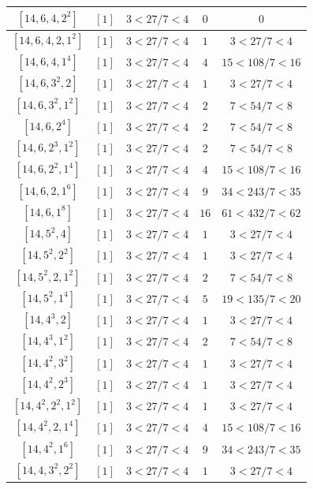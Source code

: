 \documentclass{article}%
\begin{document}
\begin{center}
\begin{longtable}{||c|c|c|c|c||}
$[14, 6, 4, 2^{2}]$ & $[1]$ & $3 < 27/7 < 4$ & $0$ & $0$ \\ \hline 
$[14, 6, 4, 2, 1^{2}]$ & $[1]$ & $3 < 27/7 < 4$ & $1$ & $3 < 27/7 < 4$ \\ \hline 
$[14, 6, 4, 1^{4}]$ & $[1]$ & $3 < 27/7 < 4$ & $4$ & $15 < 108/7 < 16$ \\ \hline 
$[14, 6, 3^{2}, 2]$ & $[1]$ & $3 < 27/7 < 4$ & $1$ & $3 < 27/7 < 4$ \\ \hline 
$[14, 6, 3^{2}, 1^{2}]$ & $[1]$ & $3 < 27/7 < 4$ & $2$ & $7 < 54/7 < 8$ \\ \hline 
$[14, 6, 2^{4}]$ & $[1]$ & $3 < 27/7 < 4$ & $2$ & $7 < 54/7 < 8$ \\ \hline 
$[14, 6, 2^{3}, 1^{2}]$ & $[1]$ & $3 < 27/7 < 4$ & $2$ & $7 < 54/7 < 8$ \\ \hline 
$[14, 6, 2^{2}, 1^{4}]$ & $[1]$ & $3 < 27/7 < 4$ & $4$ & $15 < 108/7 < 16$ \\ \hline 
$[14, 6, 2, 1^{6}]$ & $[1]$ & $3 < 27/7 < 4$ & $9$ & $34 < 243/7 < 35$ \\ \hline 
$[14, 6, 1^{8}]$ & $[1]$ & $3 < 27/7 < 4$ & $16$ & $61 < 432/7 < 62$ \\ \hline 
$[14, 5^{2}, 4]$ & $[1]$ & $3 < 27/7 < 4$ & $1$ & $3 < 27/7 < 4$ \\ \hline 
$[14, 5^{2}, 2^{2}]$ & $[1]$ & $3 < 27/7 < 4$ & $1$ & $3 < 27/7 < 4$ \\ \hline 
$[14, 5^{2}, 2, 1^{2}]$ & $[1]$ & $3 < 27/7 < 4$ & $2$ & $7 < 54/7 < 8$ \\ \hline 
$[14, 5^{2}, 1^{4}]$ & $[1]$ & $3 < 27/7 < 4$ & $5$ & $19 < 135/7 < 20$ \\ \hline 
$[14, 4^{3}, 2]$ & $[1]$ & $3 < 27/7 < 4$ & $1$ & $3 < 27/7 < 4$ \\ \hline 
$[14, 4^{3}, 1^{2}]$ & $[1]$ & $3 < 27/7 < 4$ & $2$ & $7 < 54/7 < 8$ \\ \hline 
$[14, 4^{2}, 3^{2}]$ & $[1]$ & $3 < 27/7 < 4$ & $1$ & $3 < 27/7 < 4$ \\ \hline 
$[14, 4^{2}, 2^{3}]$ & $[1]$ & $3 < 27/7 < 4$ & $1$ & $3 < 27/7 < 4$ \\ \hline 
$[14, 4^{2}, 2^{2}, 1^{2}]$ & $[1]$ & $3 < 27/7 < 4$ & $1$ & $3 < 27/7 < 4$ \\ \hline 
$[14, 4^{2}, 2, 1^{4}]$ & $[1]$ & $3 < 27/7 < 4$ & $4$ & $15 < 108/7 < 16$ \\ \hline 
$[14, 4^{2}, 1^{6}]$ & $[1]$ & $3 < 27/7 < 4$ & $9$ & $34 < 243/7 < 35$ \\ \hline 
$[14, 4, 3^{2}, 2^{2}]$ & $[1]$ & $3 < 27/7 < 4$ & $1$ & $3 < 27/7 < 4$ \\ \hline 

\end{longtable}
\end{center}
\end{document}
